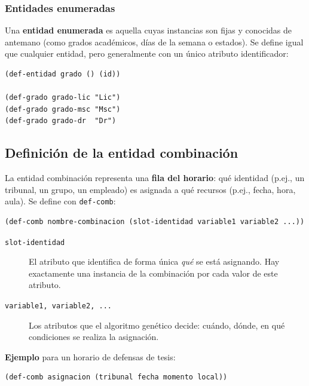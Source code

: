 \documentclass[12pt,a4paper]{article}
\newcommand{\code}[1]{\texttt{#1}}
\begin{document}
\subsubsection{Entidades enumeradas}

Una \textbf{entidad enumerada} es aquella cuyas instancias son fijas y
conocidas de antemano (como grados académicos, días de la semana o
estados). Se define igual que cualquier entidad, pero generalmente con
un único atributo identificador:

\begin{lstlisting}[style=lisp, caption={Entidad enumerada: grado académico}]
(def-entidad grado () (id))

(def-grado grado-lic "Lic")
(def-grado grado-msc "Msc")
(def-grado grado-dr  "Dr")
\end{lstlisting}

\subsection{Definición de la entidad combinación}
\label{sec:comb}

La entidad combinación representa una \textbf{fila del horario}: qué
identidad (p.ej., un tribunal, un grupo, un empleado) es asignada a qué
recursos (p.ej., fecha, hora, aula). Se define con \code{def-comb}:

\begin{lstlisting}[style=lisp, caption={Sintaxis de def-comb}]
(def-comb nombre-combinacion (slot-identidad variable1 variable2 ...))
\end{lstlisting}

\begin{description}
  \item[\code{slot-identidad}] El atributo que identifica de forma única
    \textit{qué} se está asignando. Hay exactamente una instancia de la
    combinación por cada valor de este atributo.
  \item[\code{variable1, variable2, ...}] Los atributos que el algoritmo
    genético decide: cuándo, dónde, en qué condiciones se realiza la
    asignación.
\end{description}

\textbf{Ejemplo} para un horario de defensas de tesis:

\begin{lstlisting}[style=lisp, caption={Entidad combinación para defensas de tesis}]
(def-comb asignacion (tribunal fecha momento local))
\end{lstlisting}
\end{document}
